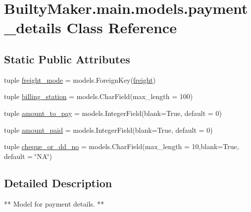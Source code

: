 \hypertarget{classBuiltyMaker_1_1main_1_1models_1_1payment__details}{\section{\-Builty\-Maker.\-main.\-models.\-payment\-\_\-details \-Class \-Reference}
\label{classBuiltyMaker_1_1main_1_1models_1_1payment__details}
}
\subsection*{\-Static \-Public \-Attributes}
\begin{DoxyCompactItemize}
\item 
tuple \hyperlink{classBuiltyMaker_1_1main_1_1models_1_1payment__details_afef6081afb92d6cd4a706e8a2ede11d6}{freight\-\_\-mode} = models.\-Foreign\-Key(\hyperlink{classBuiltyMaker_1_1main_1_1models_1_1freight}{freight})
\item 
tuple \hyperlink{classBuiltyMaker_1_1main_1_1models_1_1payment__details_ae81eb8266f116bdab4202c806c9756e0}{billing\-\_\-station} = models.\-Char\-Field(max\-\_\-length = 100)
\item 
tuple \hyperlink{classBuiltyMaker_1_1main_1_1models_1_1payment__details_ab2111d4c298430e54fdfe975916f9618}{amount\-\_\-to\-\_\-pay} = models.\-Integer\-Field(blank=\-True, default = 0)
\item 
tuple \hyperlink{classBuiltyMaker_1_1main_1_1models_1_1payment__details_a24ec14ad68b3988198bb6e609450287f}{amount\-\_\-paid} = models.\-Integer\-Field(blank=\-True, default = 0)
\item 
tuple \hyperlink{classBuiltyMaker_1_1main_1_1models_1_1payment__details_a1710bfc8f5a4d89c35273cbe418f5934}{cheque\-\_\-or\-\_\-dd\-\_\-no} = models.\-Char\-Field(max\-\_\-length = 10,blank=\-True, default = \char`\"{}\-N\-A\char`\"{})
\end{DoxyCompactItemize}


\subsection{\-Detailed \-Description}
\begin{DoxyVerb}
    ** Model for payment details. **
\end{DoxyVerb}
 

